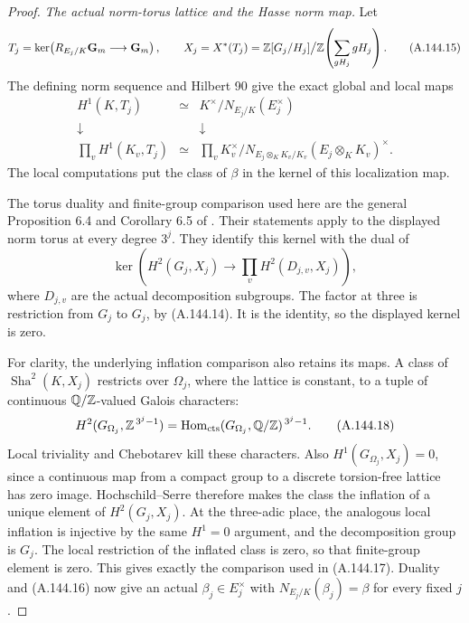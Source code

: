 \begin{proof}
\emph{The actual norm-torus lattice and the Hasse norm map.}
Let
\[
 T_j=\ker\!\left(
       R_{E_j/K}\mathbf G_m\longrightarrow\mathbf G_m\right),
 \qquad
 X_j=X^*(T_j)
      =\mathbb Z[G_j/H_j]\big/\mathbb Z\!\left(\sum_{gH_j}gH_j\right).
\tag{A.144.15}
\]
The defining norm sequence and Hilbert 90
give the exact global and local maps
\[
 \begin{array}{ccc}
 H^1(K,T_j)&\simeq&K^\times/N_{E_j/K}(E_j^\times)\\
 \downarrow&&\downarrow\\
 \displaystyle\prod_v H^1(K_v,T_j)&\simeq&
 \displaystyle\prod_v K_v^\times/
       N_{E_j\otimes_K K_v/K_v}
                     (E_j\otimes_K K_v)^\times .
 \end{array}
\tag{A.144.16}
\]
The local computations put the class of
\(\beta\) in the kernel of this
localization map.

The torus duality and finite-group
comparison used here are the general
Proposition 6.4 and Corollary 6.5 of
\cite[p.~35]{BIR_Oki2026Norm}.
Their statements apply to the displayed
norm torus at every degree \(3^j\).
They identify this kernel with the
dual of
\[
 \ker\!\left(
       H^2(G_j,X_j)\longrightarrow
                 \prod_v H^2(D_{j,v},X_j)\right),
\tag{A.144.17}
\]
where \(D_{j,v}\) are the actual
decomposition subgroups.
The factor at three is restriction
from \(G_j\) to \(G_j\), by (A.144.14).
It is the identity, so the displayed
kernel is zero.

For clarity, the underlying inflation
comparison also retains its maps.
A class of
\(\operatorname{Sha}^2(K,X_j)\) restricts
over \(\Omega_j\), where the lattice is
constant, to a tuple of continuous
\(\mathbb Q/\mathbb Z\)-valued Galois characters:
\[
 H^2(G_{\Omega_j},\mathbb Z^{\,3^j-1})
       =\operatorname{Hom}_{\rm cts}
                  (G_{\Omega_j},\mathbb Q/\mathbb Z)^{\,3^j-1}.
\tag{A.144.18}
\]
Local triviality and Chebotarev kill
these characters.
Also \(H^1(G_{\Omega_j},X_j)=0\),
since a continuous map from a compact
group to a discrete torsion-free
lattice has zero image.
Hochschild--Serre therefore makes the
class the inflation of a unique
element of \(H^2(G_j,X_j)\).
At the three-adic place, the analogous
local inflation is injective by the
same \(H^1=0\) argument, and the
decomposition group is \(G_j\).
The local restriction of the inflated
class is zero, so that finite-group
element is zero.
This gives exactly the comparison
used in (A.144.17).
Duality and (A.144.16) now give an
actual \(\beta_j\in E_j^\times\)
with \(N_{E_j/K}(\beta_j)=\beta\)
for every fixed \(j\).


\end{proof}
